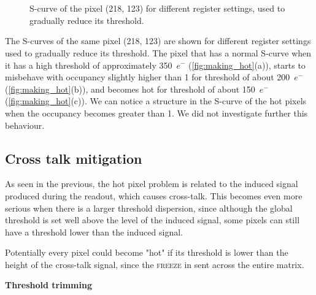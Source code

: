 \begin{figure}[h!]
\centering
{}\quad
{}\\
\\
\caption{S-curve of the pixel (218, 123) for different register settings, used to gradually reduce its threshold.}
\label{fig:making_hot}
\end{figure}

The S-curves of the same pixel (218, 123) are shown for different register settings used to gradually reduce its threshold. The pixel that has a normal S-curve when it has a high threshold of approximately 350~$e^{-}$ (\autoref{fig:making_hot}(a)), starts to misbehave with occupancy slightly higher than 1 for threshold of about 200~$e^{-}$ (\autoref{fig:making_hot}(b)), and becomes hot for threshold of about 150~$e^{-}$ (\autoref{fig:making_hot}(c)).
We can notice a structure in the S-curve of the hot pixels when the occupancy becomes greater than 1. We did not investigate further this behaviour. 



\subsection{Cross talk mitigation}

As seen in the previous, the hot pixel problem is related to the induced signal produced during the readout, which causes cross-talk. This becomes even more serious when there is a larger threshold dispersion, since although the global threshold is set well above the level of the induced signal, some pixels can still have a threshold lower than the induced signal.

Potentially every pixel could become "hot" if its threshold is lower than the height of the cross-talk signal, since the \textsc{freeze} in sent across the entire matrix. 


\begin{description}
\item \textbf{Threshold trimming}
\end{description}
 
